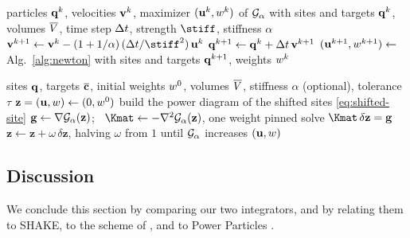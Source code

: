 \documentclass[main.tex]{subfiles}
\begin{document}
\begin{algorithm}[t]
  \caption{Time step of the penalty-based integrator (\S\ref{sec:flow-penalty}).}
  \label{alg:flow-penalty}
  \begin{algorithmic}[1]
    \Require particles $\mathbf{q}^k$, velocities $\mathbf{v}^k$, maximizer $(\mathbf{u}^k, w^k)$ of $\jointdual_\alpha$ with sites and targets $\mathbf{q}^k$, volumes $\overline{V}$, time step $\Delta t$, strength $\stiff$, stiffness $\alpha$
    \State $\vel^{k+1} \gets \vel^k - (1 + 1/\alpha)\,(\tstep/\stiff^2)\,\shift^k$ 
    \State $\mathbf{q}^{k+1} \gets \mathbf{q}^k + \Delta t\,\mathbf{v}^{k+1}$ 
    \State $(\mathbf{u}^{k+1}, w^{k+1}) \gets$ Alg.~\ref{alg:newton} with sites and targets $\mathbf{q}^{k+1}$, weights $w^k$
  \end{algorithmic}
\end{algorithm}

\begin{algorithm}[t]
  \caption{Newton solve of $\jointdual_\alpha$ (or of $\jointdual$, for $\alpha = \infty$).}
  \label{alg:newton}
  \begin{algorithmic}[1]
    \Require sites $\mathbf{q}$, targets $\overline{\mathbf{c}}$, initial weights $w^0$, volumes $\overline{V}$, stiffness $\alpha$ (optional), tolerance $\tau$
    \State $\mathbf{z} = (\mathbf{u}, w) \gets (0, w^0)$
    \Repeat
      \State build the power diagram of the shifted sites \eqref{eq:shifted-site}
      \State $\mathbf{g} \gets \nabla\mathcal{G}_\alpha(\mathbf{z})$; \ $\Kmat \gets -\nabla^2\jointdual_\alpha(\mathbf{z})$, one weight pinned
      \State solve $\Kmat\,\delta\mathbf{z} = \mathbf{g}$
      \State $\mathbf{z} \gets \mathbf{z} + \omega\,\delta\mathbf{z}$, halving $\omega$ from $1$ until $\jointdual_\alpha$ increases
    \State \Return $(\mathbf{u}, w)$
  \end{algorithmic}
\end{algorithm}

\subsection{Discussion}
\label{sec:flow-discussion}

We conclude this section by comparing our two integrators, and by relating them to SHAKE, to the scheme of \citet{Gallouet2018Lagrangian}, and to Power Particles \cite{deGoes2015PowerParticles}.
\end{document}
